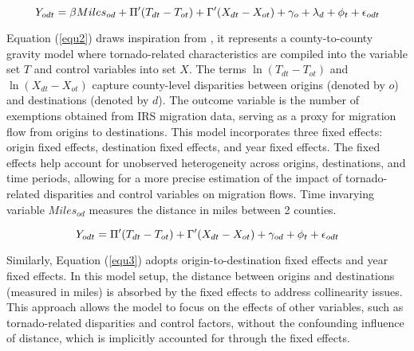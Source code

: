 \documentclass[letterpaper]{article}
\begin{document}
\begin{equation}
\label{equ2}
  \large  Y_{odt} =
    \beta Miles_{od} + \Pi'(T_{dt} - T_{ot}) + \Gamma'(X_{dt} - X_{ot}) + \gamma_o + \lambda_d + \phi_t + \epsilon_{odt}
\end{equation}

Equation (\ref{equ2}) draws inspiration from \textcite{wilson2022isolated}, it represents a county-to-county gravity model where tornado-related characteristics are compiled into the variable set \( T \) and control variables into set \( X \). The terms \( \ln(T_{dt} - T_{ot}) \) and \( \ln(X_{dt} - X_{ot}) \) capture county-level disparities between origins (denoted by \( o \)) and destinations (denoted by \( d \)). The outcome variable is the number of exemptions obtained from IRS migration data, serving as a proxy for migration flow from origins to destinations. This model incorporates three fixed effects: origin fixed effects, destination fixed effects, and year fixed effects. The fixed effects help account for unobserved heterogeneity across origins, destinations, and time periods, allowing for a more precise estimation of the impact of tornado-related disparities and control variables on migration flows. Time invarying variable $Miles_{od}$ measures the distance in miles between 2 counties.

\begin{equation}
\label{equ3}
   \large Y_{odt} =
    \Pi'(T_{dt} - T_{ot}) + \Gamma'(X_{dt} - X_{ot}) + \gamma_{od} + \phi_t + \epsilon_{odt}
\end{equation}

Similarly, Equation (\ref{equ3}) adopts origin-to-destination fixed effects and year fixed effects. In this model setup, the distance between origins and destinations (measured in miles) is absorbed by the fixed effects to address collinearity issues. This approach allows the model to focus on the effects of other variables, such as tornado-related disparities and control factors, without the confounding influence of distance, which is implicitly accounted for through the fixed effects.
\end{document}
